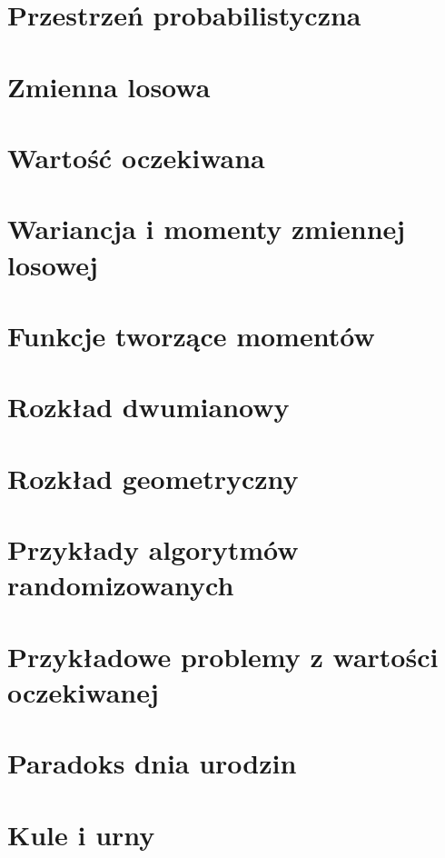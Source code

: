 \section{Przestrzeń probabilistyczna}


\newpage
\section{Zmienna losowa}


\newpage
\section{Wartość oczekiwana}


\newpage
\section{Wariancja i momenty zmiennej losowej}


\newpage
\section{Funkcje tworzące momentów}


\newpage
\section{Rozkład dwumianowy}


\newpage
\section{Rozkład geometryczny}


\newpage
\section{Przykłady algorytmów randomizowanych}


\newpage
\section{Przykładowe problemy z wartości oczekiwanej}


\newpage
\section{Paradoks dnia urodzin}


\newpage
\section{Kule i urny}

